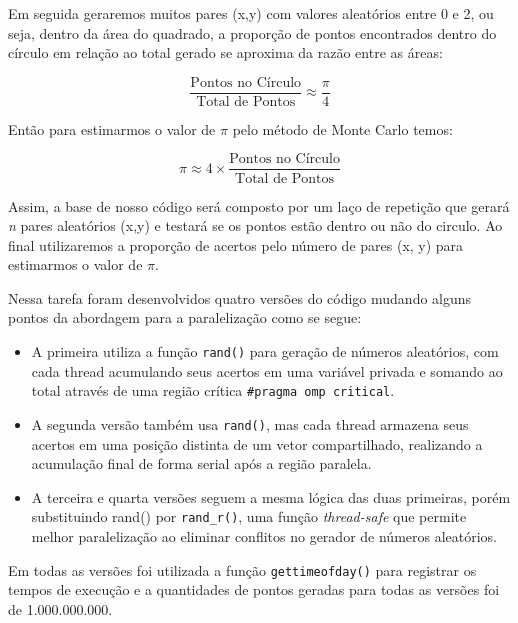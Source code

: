 \documentclass[a4paper, 12pt]{article}
\begin{document}
	Em seguida geraremos muitos pares (x,y) com valores aleatórios entre 0 e 2, ou seja, dentro da área do quadrado, a proporção de pontos encontrados dentro do círculo em relação ao total gerado se aproxima da razão entre as áreas:
	
	\[
	\frac{\text{Pontos no Círculo}}{\text{Total de Pontos}} \approx \frac{\pi}{4}
	\]
	
	\vspace{1.5cm}
	
	Então para estimarmos o valor de $\pi$ pelo método de Monte Carlo temos:
	
	\[
	\pi \approx 4 \times \frac{\text{Pontos no Círculo}}{\text{Total de Pontos}}
	\]
	
	\vspace{.5cm}
	
	Assim, a base de nosso código será composto por um laço de repetição que gerará \textit{n} pares aleatórios (x,y) e testará se os pontos estão dentro ou não do circulo. Ao final utilizaremos a proporção de acertos pelo número de pares (x, y) para estimarmos o valor de $\pi$.
	
	Nessa tarefa foram desenvolvidos quatro versões do código mudando alguns pontos da abordagem para a paralelização como se segue:
	
	\begin{itemize}
		\item A primeira utiliza a função \texttt{rand()} para geração de números aleatórios, com cada thread acumulando seus acertos em uma variável privada e somando ao total através de uma região crítica \texttt{\#pragma omp critical}.
		
		\item A segunda versão também usa \texttt{rand()}, mas cada thread armazena seus acertos em uma posição distinta de um vetor compartilhado, realizando a acumulação final de forma serial após a região paralela.
		
		\item A terceira e quarta versões seguem a mesma lógica das duas primeiras, porém substituindo rand() por \texttt{rand\_r()}, uma função \textit{thread-safe} que permite melhor paralelização ao eliminar conflitos no gerador de números aleatórios.
	\end{itemize}
	
	Em todas as versões foi utilizada a função \texttt{gettimeofday()} para registrar os tempos de execução e a quantidades de pontos geradas para todas as versões foi de {1.000.000.000}.		
	
\end{document}
